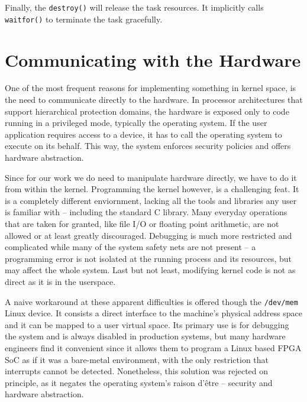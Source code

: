 Finally, the \texttt{destroy()} will release the task resources.
It implicitly calls \texttt{waitfor()} to terminate the task gracefully.


\section{Communicating with the Hardware}

One of the most frequent reasons for implementing something in kernel space,
is the need to communicate directly to the hardware. In processor architectures
that support hierarchical protection domains, the hardware is exposed only to
code running in a privileged mode, typically the operating system.
If the user application requires access to a device, it has to call the operating
system to execute on its behalf. This way, the system enforces security policies
and offers hardware abstraction. 

Since for our work we do need to manipulate hardware directly, we have to do it from
within the kernel. Programming the kernel however, is a challenging feat.
It is a completely different enviornment, lacking all the tools and libraries any
user is familiar with -- including the standard C library. Many everyday operations
that are taken for granted, like file I/O or floating point arithmetic,
are not allowed or at least greatly discouraged. Debugging is much more restricted
and complicated while many of the system safety nets are not present -- a programming
error is not isolated at the running process and its resources, but may affect the whole system.
Last but not least, modifying kernel code is not as direct as it is in the userspace.

A naive workaround at these apparent difficulties is offered though the \texttt{/dev/mem} Linux device. 
It consists a direct interface to the machine's physical address space and it can be mapped to a user virtual space. 
Its primary use is for debugging the system and is always disabled in production systems, but many hardware engineers
find it convenient since it allows them to program a Linux based FPGA SoC as if it was a bare-metal environment,
with the only restriction that interrupts cannot be detected. 
Nonetheless, this solution was rejected on principle, as it negates the operating system's raison d'être --
security and hardware abstraction.

